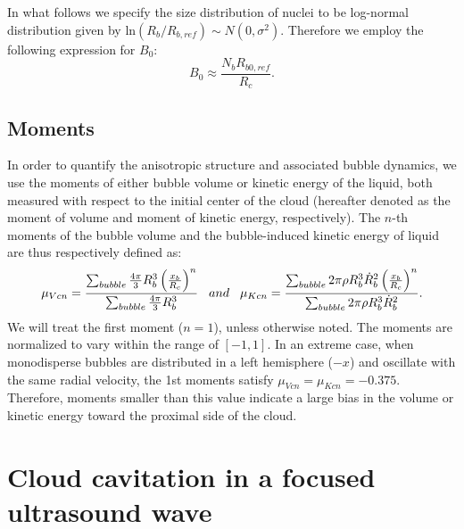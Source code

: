 \documentclass{jfm}
\begin{document}
In what follows we specify the size distribution of nuclei to be log-normal distribution given by ${\mathrm{ln}}(R_b/R_{b,ref})\sim N(0,\sigma^2)$.
Therefore we employ the following expression for $B_0$:
\begin{equation}
B_0\approx\frac{N_bR_{b0,ref}}{R_c}.
\end{equation}

\subsection{Moments}
In order to quantify the anisotropic structure and associated bubble dynamics, we use the moments of either bubble volume or kinetic energy of the liquid, both measured with respect to the initial center of the cloud (hereafter denoted as the moment of volume and moment of kinetic energy, respectively).
The $n$-th moments of the bubble volume and the bubble-induced kinetic energy of liquid are thus respectively defined as:
\begin{equation}
\mu_{Vcn}=\frac{\sum_{bubble}\frac{4\pi}{3}R^3_b\left(\frac{x_b}{R_c}\right)^n}{\sum_{bubble}\frac{4\pi}{3}R^3_b}
\hspace{3mm}and \hspace{3mm}
\mu_{Kcn}=\frac{\sum_{bubble}2\pi\rho R^3_b\dot{R}^2_b\left(\frac{x_b}{R_c}\right)^n}{\sum_{bubble}2\pi\rho R^3_b\dot{R}^2_b}.
\end{equation}
We will treat the first moment ($n=1$), unless otherwise noted.
The moments are normalized to vary within the range of $[-1, 1]$. In an extreme case, when monodisperse bubbles are distributed in a left hemisphere ($-x$) and oscillate with the same radial velocity, the 1st moments satisfy $\mu_{Vcn}=\mu_{Kcn}=-0.375$. Therefore, moments smaller than this value indicate a large bias in the volume or kinetic energy toward the proximal side of the cloud.

\section{Cloud cavitation in a focused ultrasound wave}
\label{section:focused}
\end{document}
